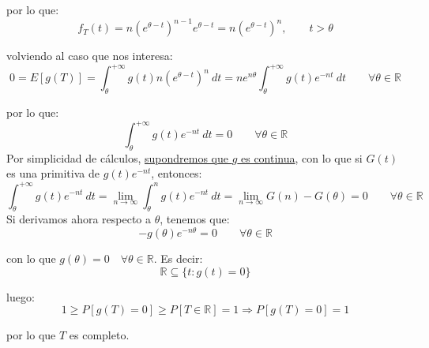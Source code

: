 \begin{ejercicio}
    por lo que:
    \begin{equation*}
        f_T(t) = n{\left(e^{\theta-t}\right)}^{n-1}e^{\theta-t} = n{\left(e^{\theta-t}\right)}^{n}, \qquad t>\theta
    \end{equation*}

    volviendo al caso que nos interesa:
    \begin{equation*}
        0 = E[g(T)] = \int_{\theta}^{+\infty} g(t)n{\left(e^{\theta-t}\right)}^{n} ~dt  = ne^{n\theta} \int_{\theta}^{+\infty} g(t)e^{-nt} ~dt  \qquad \forall \theta \in \mathbb{R}
    \end{equation*}

    por lo que:
    \begin{equation*}
        \int_{\theta}^{+\infty} g(t)e^{-nt}~dt  = 0 \qquad \forall \theta\in \mathbb{R}
    \end{equation*}
    Por simplicidad de cálculos, \underline{supondremos que $g$ es continua}, con lo que si $G(t)$ es una primitiva de $g(t)e^{-nt}$, entonces:
    \begin{equation*}
        \int_{\theta}^{+\infty} g(t)e^{-nt}~dt = \lim_{n\to\infty}\int_{\theta}^{n}g(t)e^{-nt} ~dt  = \lim_{n\to\infty}G(n)-G(\theta) =  0 \qquad \forall \theta\in \mathbb{R}
    \end{equation*}
    Si derivamos ahora respecto a $\theta$, tenemos que:
    \begin{equation*}
        -g(\theta)e^{-n\theta} = 0\qquad \forall \theta\in \mathbb{R}
    \end{equation*}

    con lo que $g(\theta) = 0 \quad \forall \theta\in \mathbb{R}$. Es decir:
    \begin{equation*}
        \mathbb{R}\subseteq \{t:g(t) = 0\}
    \end{equation*}

    luego:
    \begin{equation*}
        1\geq P[g(T)=0] \geq P[T\in \mathbb{R}] = 1 \Longrightarrow P[g(T)=0]=1
    \end{equation*}

    por lo que $T$ es completo.
\end{ejercicio}

